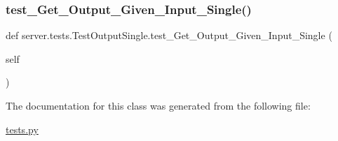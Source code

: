 \subsubsection{\texorpdfstring{test\+\_\+\+Get\+\_\+\+Output\+\_\+\+Given\+\_\+\+Input\+\_\+\+Single()}{test\_Get\_Output\_Given\_Input\_Single()}}
{\footnotesize\ttfamily def server.\+tests.\+Test\+Output\+Single.\+test\+\_\+\+Get\+\_\+\+Output\+\_\+\+Given\+\_\+\+Input\+\_\+\+Single (\begin{DoxyParamCaption}\item[{}]{self }\end{DoxyParamCaption})}



The documentation for this class was generated from the following file\+:\begin{DoxyCompactItemize}
\item 
\mbox{\hyperlink{tests_8py}{tests.\+py}}\end{DoxyCompactItemize}
